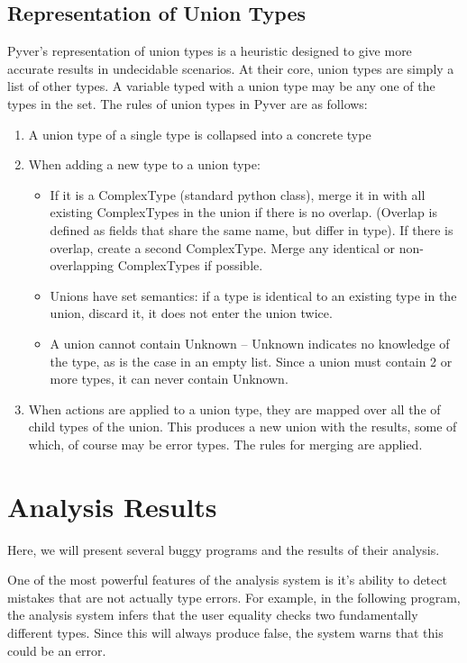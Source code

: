 \documentclass{article}[12pt]
\begin{document}
\subsection{Representation of Union Types}
Pyver's representation of union types is a heuristic designed to give more accurate results in undecidable
scenarios. At their core, union types are simply a list of other types. A variable typed with a union type may be any one
of the types in the set. The rules of union types in Pyver are as follows:
\begin{enumerate}
  \item A union type of a single type is collapsed into a concrete type
  \item When adding a new type to a union type: 
      \begin{itemize}
          \item If it is a ComplexType (standard python class), merge it in with all existing ComplexTypes in the union if
              there is no overlap. (Overlap is defined as fields that share the same name, but differ in type). If there
              is overlap, create a second ComplexType. Merge any identical or non-overlapping ComplexTypes if possible.
          \item Unions have set semantics: if a type is identical to an existing type in the union, discard it, it does
              not enter the union twice.
          \item A union cannot contain Unknown -- Unknown indicates no knowledge of the type, as is the case in an empty
              list. Since a union must contain 2 or more types, it can never contain Unknown.
      \end{itemize}
  \item When actions are applied to a union type, they are mapped over all the of child types of the union. This
      produces a new union with the results, some of which, of course may be error types. The rules for merging are
      applied.
\end{enumerate}



\section{Analysis Results}

Here, we will present several buggy programs and the results of their analysis.

One of the most powerful features of the analysis system is it's ability to detect mistakes that are
not actually type errors. For example, in the following program, the analysis system infers that the
user equality checks two fundamentally different types. Since this will always produce false, the
system warns that this could be an error.
\end{document}
